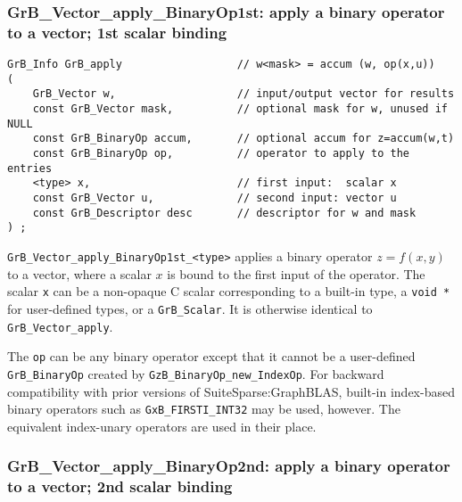 \documentclass[12pt]{article}
\begin{document}
\subsubsection{{\sf GrB\_Vector\_apply\_BinaryOp1st:} apply a binary operator to a vector; 1st scalar binding}
\label{vector_apply1st}

\begin{mdframed}[userdefinedwidth=6in]
{\footnotesize
\begin{verbatim}
GrB_Info GrB_apply                  // w<mask> = accum (w, op(x,u))
(
    GrB_Vector w,                   // input/output vector for results
    const GrB_Vector mask,          // optional mask for w, unused if NULL
    const GrB_BinaryOp accum,       // optional accum for z=accum(w,t)
    const GrB_BinaryOp op,          // operator to apply to the entries
    <type> x,                       // first input:  scalar x
    const GrB_Vector u,             // second input: vector u
    const GrB_Descriptor desc       // descriptor for w and mask
) ;
\end{verbatim} } \end{mdframed}

\verb'GrB_Vector_apply_BinaryOp1st_<type>'  applies a binary operator
$z=f(x,y)$ to a vector, where a scalar $x$ is bound to the first input of the
operator.
The scalar \verb'x' can be a non-opaque C scalar corresponding to a built-in
type, a \verb'void *' for user-defined types, or a \verb'GrB_Scalar'.
It is otherwise identical to \verb'GrB_Vector_apply'.

The \verb'op' can be any binary operator except that it cannot be a
user-defined \verb'GrB_BinaryOp' created by \verb'GzB_BinaryOp_new_IndexOp'.
For backward compatibility with prior versions of SuiteSparse:GraphBLAS,
built-in index-based binary operators such as \verb'GxB_FIRSTI_INT32' may be
used, however.  The equivalent index-unary operators are used in their place.

\newpage
\subsubsection{{\sf GrB\_Vector\_apply\_BinaryOp2nd:} apply a binary operator to a vector; 2nd scalar binding}
\label{vector_apply2nd}
\end{document}
